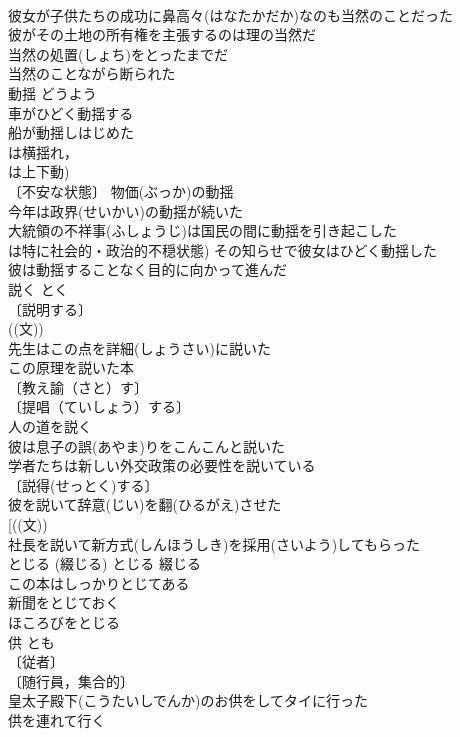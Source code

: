 \documentclass[8pt]{extreport}
\begin{document}
\begin{CJK}{UTF8}{min}
\\	彼女が子供たちの成功に鼻高々(はなたかだか)なのも当然のことだった 
\\	彼がその土地の所有権を主張するのは理の当然だ 
\\	当然の処置(しょち)をとったまでだ 
\\	当然のことながら断られた 
\\	動揺	どうよう	
\\	車がひどく動揺する 
\\	船が動揺しはじめた 
\\	は横揺れ，
\\	は上下動) 
\\	〔不安な状態〕 物価(ぶっか)の動揺 
\\	今年は政界(せいかい)の動揺が続いた 
\\	大統領の不祥事(ふしょうじ)は国民の間に動揺を引き起こした 
\\	は特に社会的・政治的不穏状態) その知らせで彼女はひどく動揺した 
\\	彼は動揺することなく目的に向かって進んだ 
\\	説く	とく	
\\	〔説明する〕
\\	((文)) 
\\	先生はこの点を詳細(しょうさい)に説いた 
\\	この原理を説いた本 
\\	〔教え諭（さと）す〕
\\	〔提唱（ていしょう）する〕
\\	人の道を説く 
\\	彼は息子の誤(あやま)りをこんこんと説いた 
\\	学者たちは新しい外交政策の必要性を説いている 
\\	〔説得(せっとく)する〕
\\	彼を説いて辞意(じい)を翻(ひるがえ)させた 
\\	[((文))
\\	社長を説いて新方式(しんほうしき)を採用(さいよう)してもらった 
\\	とじる (綴じる)	とじる	綴じる 
\\	この本はしっかりとじてある 
\\	新聞をとじておく 
\\	ほころびをとじる 
\\	供	とも	
\\	〔従者〕
\\	〔随行員，集合的〕
\\	皇太子殿下(こうたいしでんか)のお供をしてタイに行った 
\\	供を連れて行く 

\end{CJK}
\end{document}
